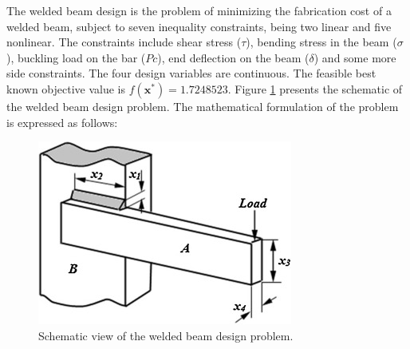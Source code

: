 
The welded beam design \citep{WB} is the problem of minimizing the fabrication cost of a welded beam, subject to seven inequality constraints, being two linear and five nonlinear. The constraints include shear stress ($\tau$), bending stress in the beam ($\sigma$), buckling load on the bar ($Pc$), end deflection on the beam ($\delta$) and some more side constraints. The four design variables are continuous. The feasible best known objective value is $f(\bm{x}^*) = 1.7248523$. Figure \ref{fig:WB} presents the schematic of the welded beam design problem. The mathematical formulation of the problem is expressed as follows:

\vspace{-0.5cm}



\vspace{0.5cm}

\begin{figure}[h]
    \begin{center}
    \includegraphics[scale=0.7]{img/Problems/WB.jpg}
    \end{center}
    \captionsetup{justification=centering}
    \caption{Schematic view of the welded beam design problem.}\label{fig:WB}
\end{figure}